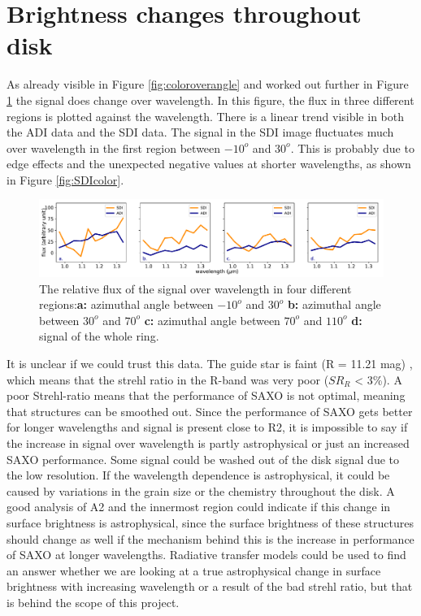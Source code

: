 \documentclass[twoside,single]{lion-msc}
\begin{document}
\section{Brightness changes throughout disk}
As already visible in Figure \ref{fig:coloroverangle} and worked out further in Figure \ref{fig:coloroverpos} the signal does change over wavelength. In this figure, the flux in three different regions is plotted against the wavelength. There is a linear trend visible in both the ADI data and the SDI data. The signal in the SDI image fluctuates much over wavelength in the first region between $-10^o$ and $30^o$. This is probably due to edge effects and the unexpected negative values at shorter wavelengths, as shown in Figure \ref{fig:SDIcolor}. 

\begin{figure}[htb]
\centering
\includegraphics[trim={0cm 0cm 0cm 0cm},clip,width = \textwidth]{coloroverpos}
\caption{The relative flux of the signal over wavelength in four different regions:\textbf{a:} azimuthal angle between $-10^o$ and $30^o$  \textbf{b:} azimuthal angle between $30^o$ and $70^o$ \textbf{c:} azimuthal angle between $70^o$ and $110^o$ \textbf{d:} signal of the whole ring.}
\label{fig:coloroverpos}
\end{figure}

It is unclear if we could trust this data. The guide star is faint (R = 11.21 mag) \citep{Makarov2007}, which means that the strehl ratio in the R-band was very poor ($SR_R$ < 3\%\citep{DeBoer2016}). A poor Strehl-ratio means that the performance of SAXO is not optimal, meaning that structures can be smoothed out. Since the performance of SAXO gets better for longer wavelengths and signal is present close to R2, it is impossible to say if the increase in signal over wavelength is partly astrophysical or just an increased SAXO performance. Some signal could be washed out of the disk signal due to the low resolution. If the wavelength dependence is astrophysical, it could be caused by variations in the grain size or the chemistry throughout the disk. A good analysis of A2 and the innermost region could indicate if this change in surface brightness is astrophysical, since the surface brightness of these structures should change as well if the mechanism behind this is the increase in performance of SAXO at longer wavelengths. Radiative transfer models could be used to find an answer whether we are looking at a true astrophysical change in surface brightness with increasing wavelength or a result of the bad strehl ratio, but that is behind the scope of this project.
\bigskip
\end{document}

